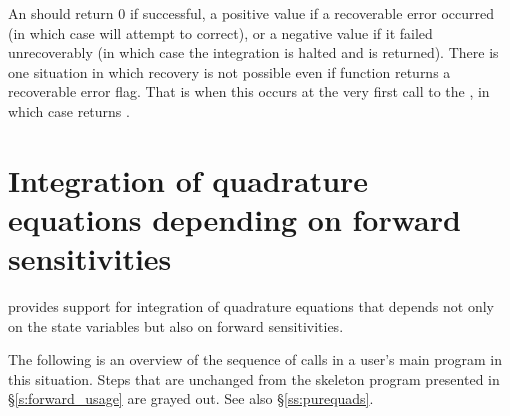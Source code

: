{
  An  should return 0 if successful, a positive value if a recoverable
  error occurred (in which case {\idas} will attempt to correct), or a negative 
  value if it failed unrecoverably (in which case the integration is halted and
   is returned).
}
{
  There is one situation in which recovery is not possible even if
   function returns a recoverable error flag.  That is
  when this occurs at the very first call to the , in
  which case {\idas} returns .
}

\section{Integration of quadrature equations depending on forward sensitivities}
\label{s:forward_quad_usage}

{\idas} provides support for integration of quadrature equations that depends not only 
on the state variables but also on forward sensitivities.

The following is an overview of the sequence of calls in a user's main program in 
this situation. Steps that are unchanged from the skeleton program presented in 
\S\ref{s:forward_usage} are grayed out.  See also \S\ref{ss:purequads}.

